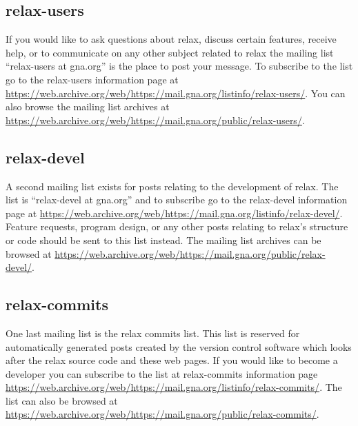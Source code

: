 \subsection{relax-users} \label{sect: relax-users mailing list}

If you would like to ask questions about relax, discuss certain features, receive help, or to communicate on any other subject related to relax the mailing list ``relax-users at gna.org'' is the place to post your message.
To subscribe to the list go to the relax-users information page at \href{https://web.archive.org/web/https://mail.gna.org/listinfo/relax-users/}{https://web.archive.org/web/https://mail.gna.org/listinfo/relax-users/}.
You can also browse the mailing list archives at \href{https://web.archive.org/web/https://mail.gna.org/public/relax-users/}{https://web.archive.org/web/https://mail.gna.org/public/relax-users/}.


\subsection{relax-devel} \label{sect: relax-devel mailing list}

A second mailing list exists for posts relating to the development of relax.
The list is ``relax-devel at gna.org'' and to subscribe go to the relax-devel information page at \href{https://web.archive.org/web/https://mail.gna.org/listinfo/relax-devel/}{https://web.archive.org/web/https://mail.gna.org/listinfo/relax-devel/}.
Feature requests, program design, or any other posts relating to relax's structure or code should be sent to this list instead.
The mailing list archives can be browsed at \href{https://web.archive.org/web/https://mail.gna.org/public/relax-devel/}{https://web.archive.org/web/https://mail.gna.org/public/relax-devel/}.


\subsection{relax-commits}

One last mailing list is the relax commits list.
This list is reserved for automatically generated posts created by the version control software which looks after the relax source code and these web pages.
If you would like to become a developer you can subscribe to the list at relax-commits information page \href{https://mail.gna.oactuallyrg/listinfo/relax-commits/}{https://web.archive.org/web/https://mail.gna.org/listinfo/relax-commits/}.
The list can also be browsed at \href{https://web.archive.org/web/https://mail.gna.org/public/relax-commits/}{https://web.archive.org/web/https://mail.gna.org/public/relax-commits/}.


